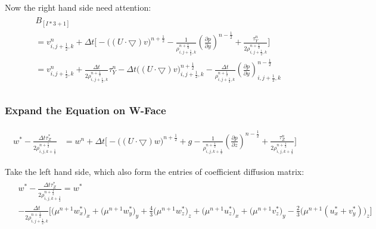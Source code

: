 \documentclass{article}
\numberwithin{equation}{subsection}
\begin{document}
Now the right hand side need attention:
\begin{align}
\begin{split}
& B_{[I*3+1]}\\
& = v^n_{i,j+\frac{1}{2},k} + \Delta t \Bigg[ -\Big( (U \cdot \bigtriangledown) v\Big)^{n+\frac{1}{2}}
 -\frac{1}{\rho^{n+\frac{1}{2}}_{i,j+\frac{1}{2},k}} (\frac{\partial p}{\partial y})^{n-\frac{1}{2}} + \frac{\tau^{n}_Y}{2\rho^{n+\frac{1}{2}}_{i,j+\frac{1}{2},k}} \Bigg] \\
& = v^n_{i,j+\frac{1}{2},k} + \frac{\Delta t}{2\rho^{n+\frac{1}{2}}_{i,j+\frac{1}{2},k}}\tau^{n}_Y -\Delta t \Big( (U \cdot \bigtriangledown) v\Big)^{n+\frac{1}{2}}_{i,j+\frac{1}{2},k} - \frac{\Delta t}{\rho^{n+\frac{1}{2}}_{i,j+\frac{1}{2},k}}(\frac{\partial p}{\partial y})^{n-\frac{1}{2}}_{i,j+\frac{1}{2},k}\\
\end{split}
\end{align}




\subsubsection{Expand the Equation on W-Face}

\begin{align}
\begin{split}
w^{*} - \frac{\Delta t  \tau_Z^{*}}{2\rho^{n+\frac{1}{2}}_{i,j,k+\frac{1}{2}}} &= w^n + \Delta t \Bigg[ -\Big( (U \cdot \bigtriangledown) w\Big)^{n+\frac{1}{2}} + g
-\frac{1}{\rho^{n+\frac{1}{2}}_{i,j,k+\frac{1}{2}}}  (\frac{\partial p}{\partial z})^{n-\frac{1}{2}} + \frac{ \tau_Z^{n}}{2\rho^{n+\frac{1}{2}}_{i,j,k+\frac{1}{2}}} \Bigg]
\end{split}
\end{align}


Take the left hand side, which also form the entries of coefficient diffusion matrix:
\begin{align}
\begin{split}
& w^{*} - \frac{\Delta t  \tau_Z^{*}}{2\rho^{n+\frac{1}{2}}_{i,j,k+\frac{1}{2}}} = w^{*} \\
& -\frac{\Delta t}{2\rho^{n+\frac{1}{2}}_{i,j+\frac{1}{2},k}} \Bigg[ \Big(\mu^{n+1} w^*_x\Big)_x + \Big(\mu^{n+1} w^*_y \Big)_y  + \frac{4}{3}\Big(\mu^{n+1} w^*_z\Big)_z + \Big(\mu^{n+1} u^*_z \Big)_x + \Big(\mu^{n+1} v^*_z\Big)_y - \frac{2}{3}\Big(\mu^{n+1}(u^*_x + v^*_y)\Big)_z \Bigg]
\end{split}
\end{align}
\end{document}
